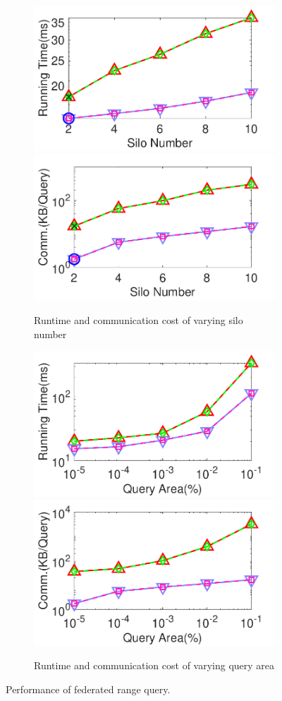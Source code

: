 \begin{figure}[t]
    \begin{subfigure}{0.48\textwidth}
        \centering
        \includegraphics[width=0.48\linewidth]{rangequery_silo_time.pdf}
        \includegraphics[width=0.48\linewidth]{rangequery_silo_cost.pdf}
        \caption{Runtime and communication cost of varying silo number}
        \label{fig:range-eff-silo-n}
    \end{subfigure}
    \begin{subfigure}{0.48\textwidth}
        \centering
        \includegraphics[width=0.48\linewidth]{rangequery_area_time.pdf}
        \includegraphics[width=0.48\linewidth]{rangequery_area_cost.pdf}
        \caption{Runtime and communication cost of varying query area}
        \label{fig:range-eff-r-n}
    \end{subfigure}
    \caption{Performance of federated range query.}
    \label{fig:range-eff}
\end{figure}


